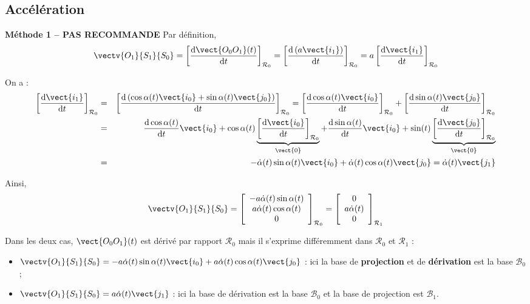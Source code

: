 \subsection*{Accélération}



\ifprof
\begin{corrige}


\textbf{Méthode 1 -- PAS RECOMMANDE }
Par définition, 
$$
\vectv{O_1}{S_1}{S_0} 
= \left[\dfrac{\text{d}\vect{O_0O_1}(t)}{\text{d}t}\right]_{\mathcal{R}_0}
= \left[\dfrac{\text{d} \left(a \vect{i_1}\right) }{\text{d}t}\right]_{\mathcal{R}_0}
= a \left[\dfrac{\text{d}  \vect{i_1} }{\text{d}t}\right]_{\mathcal{R}_0}
$$

On a :
\begin{eqnarray*}
\left[\dfrac{\text{d}  \vect{i_1} }{\text{d}t}\right]_{\mathcal{R}_0}
&=&\left[\dfrac{\text{d} \left(\cos\alpha(t)\vect{i_0}+\sin\alpha(t)\vect{j_0} \right)}{\text{d}t}\right]_{\mathcal{R}_0}
=\left[\dfrac{\text{d}  \cos\alpha(t)\vect{i_0}}{\text{d}t}\right]_{\mathcal{R}_0}
+\left[\dfrac{\text{d}  \sin\alpha(t)\vect{j_0} }{\text{d}t}\right]_{\mathcal{R}_0}\\
& = & 
\dfrac{\text{d} \cos\alpha(t)}{\text{d}t} \vect{i_0}  
+\cos\alpha(t)\underbrace{\left[\dfrac{\text{d}  \vect{i_0}}{\text{d}t}\right]_{\mathcal{R}_0}}_{\vect{0}}
+\dfrac{\text{d} \sin\alpha(t)}{\text{d}t} \vect{i_0}  
+\sin(t)\underbrace{\left[\dfrac{\text{d}  \vect{j_0}}{\text{d}t}\right]_{\mathcal{R}_0}}_{\vect{0}}\\
& = & -\dot{\alpha}(t)\sin\alpha(t) \vect{i_0}   + \dot{\alpha}(t)\cos\alpha(t) \vect{j_0}  = 
\dot{\alpha}(t)\vect{j_1}
\end{eqnarray*}

Ainsi,
$$
\vectv{O_1}{S_1}{S_0} 
= \left[\begin{array}{c} 
-a\dot{\alpha}(t)\sin\alpha(t) \\
a \dot{\alpha}(t)\cos\alpha(t) \\
0 \end{array}\right]_{\mathcal{R}_0}
=\left[\begin{array}{c} 0 \\ a\dot{\alpha}(t) \\ 0\end{array}\right]_{\mathcal{R}_1}
$$

Dans les deux cas, $\vect{O_0O_1}(t)$ est dérivé par rapport $\mathcal{R}_0$ mais il s'exprime différemment dans $\mathcal{R}_0$ et $\mathcal{R}_1$ :
\begin{itemize}
\item $\vectv{O_1}{S_1}{S_0} = -a\dot{\alpha}(t)\sin\alpha(t) \vect{i_0}   + a\dot{\alpha}(t) \cos\alpha(t) \vect{j_0}$ : ici la base de \textbf{projection} et de \textbf{dérivation} est la base $\mathcal{B}_0$;
\item $\vectv{O_1}{S_1}{S_0} = a\dot{\alpha}(t)\vect{j_1}$ : ici la base de dérivation est la base $\mathcal{B}_0$ et la base de projection est $\mathcal{B}_1$.
\end{itemize}


\end{corrige}
